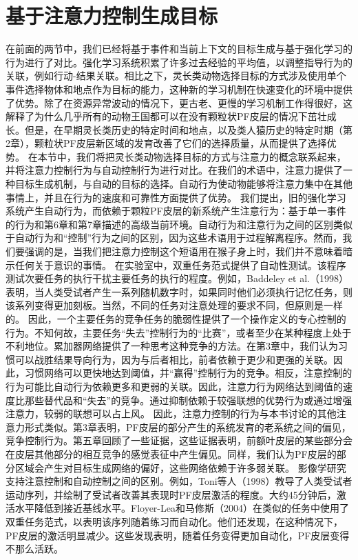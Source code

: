 \section{基于注意力控制生成目标}
在前面的两节中，我们已经将基于事件和当前上下文的目标生成与基于强化学习的行为进行了对比。强化学习系统积累了许多过去经验的平均值，以调整指导行为的关联，例如行动-结果关联。相比之下，灵长类动物选择目标的方式涉及使用单个事件选择物体和地点作为目标的能力，这种新的学习机制在快速变化的环境中提供了优势。除了在资源异常波动的情况下，更古老、更慢的学习机制工作得很好，这解释了为什么几乎所有的动物王国都可以在没有颗粒状PF皮层的情况下茁壮成长。但是，在早期灵长类历史的特定时间和地点，以及类人猿历史的特定时期（第2章），颗粒状PF皮层新区域的发育改善了它们的选择质量，从而提供了选择优势。
在本节中，我们将把灵长类动物选择目标的方式与注意力的概念联系起来，并将注意力控制行为与自动控制行为进行对比。在我们的术语中，注意力提供了一种目标生成机制，与自动的目标的选择。自动行为使动物能够将注意力集中在其他事情上，并且在行为的速度和可靠性方面提供了优势。
我们提出，旧的强化学习系统产生自动行为，而依赖于颗粒PF皮层的新系统产生注意行为：基于单一事件的行为和第6章和第7章描述的高级当前环境。自动行为和注意行为之间的区别类似于自动行为和“控制”行为之间的区别，因为这些术语用于过程解离程序。然而，我们要强调的是，当我们把注意力控制这个短语用在猴子身上时，我们并不意味着暗示任何关于意识的事情。
在实验室中，双重任务范式提供了自动性测试。该程序测试次要任务的执行干扰主要任务的执行的程度。例如，Baddeley et al.（1998）表明，当人类受试者产生一系列随机数字时，如果同时他们必须执行记忆任务，则该系列变得更加刻板。当然，不同的任务对注意处理的要求不同，但原则是一样的。
因此，一个主要任务的竞争任务的脆弱性提供了一个操作定义的专心控制的行为。不知何故，主要任务“失去”控制行为的“比赛”，或者至少在某种程度上处于不利地位。累加器网络提供了一种思考这种竞争的方法。在第3章中，我们认为习惯可以战胜结果导向行为，因为与后者相比，前者依赖于更少和更强的关联。因此，习惯网络可以更快地达到阈值，并“赢得”控制行为的竞争。相反，注意控制的行为可能比自动行为依赖更多和更弱的关联。因此，注意力行为网络达到阈值的速度比那些替代品和“失去”的竞争。通过抑制依赖于较强联想的优势行为或通过增强注意力，较弱的联想可以占上风。
因此，注意力控制的行为与本书讨论的其他注意力形式类似。第3章表明，PF皮层的部分产生的系统发育的老系统之间的偏见，竞争控制行为。第五章回顾了一些证据，这些证据表明，前额叶皮层的某些部分会在皮层其他部分的相互竞争的感觉表征中产生偏见。同样，我们认为PF皮层的部分区域会产生对目标生成网络的偏好，这些网络依赖于许多弱关联。
影像学研究支持注意控制和自动控制之间的区别。例如，Toni等人（1998）教导了人类受试者运动序列，并绘制了受试者改善其表现时PF皮层激活的程度。大约45分钟后，激活水平降低到接近基线水平。Floyer-Lea和马修斯（2004）在类似的任务中使用了双重任务范式，以表明该序列随着练习而自动化。他们还发现，在这种情况下，PF皮层的激活明显减少。这些发现表明，随着任务变得更加自动化，PF皮层变得不那么活跃。
